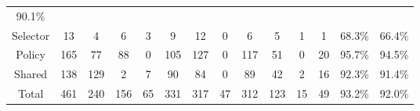 \begin{table*}[ht]
\begin{center}
\begin{tabular}{cccccccccccccc}
            90.1\% \\
          \multicolumn{1}{c|}{Selector} &
            \multicolumn{1}{c|}{13} &
            4 &
            6 &
            \multicolumn{1}{c|}{3} &
            9 &
            12 &
            \multicolumn{1}{c|}{0} &
            6 &
            5 &
            1 &
            \multicolumn{1}{c|}{1} &
            68.3\% &
            66.4\% \\
          \multicolumn{1}{c|}{Policy} &
            \multicolumn{1}{c|}{165} &
            77 &
            88 &
            \multicolumn{1}{c|}{0} &
            105 &
            127 &
            \multicolumn{1}{c|}{0} &
            117 &
            51 &
            0 &
            \multicolumn{1}{c|}{20} &
            95.7\% &
            94.5\% \\
          \multicolumn{1}{c|}{Shared} &
            \multicolumn{1}{c|}{138} &
            129 &
            2 &
            \multicolumn{1}{c|}{7} &
            90 &
            84 &
            \multicolumn{1}{c|}{0} &
            89 &
            42 &
            2 &
            \multicolumn{1}{c|}{16} &
            92.3\% &
            91.4\% \\
          \multicolumn{1}{c|}{Total} &
            \multicolumn{1}{c|}{461} &
            240 &
            156 &
            \multicolumn{1}{c|}{65} &
            331 &
            317 &
            \multicolumn{1}{c|}{47} &
            312 &
            123 &
            15 &
            \multicolumn{1}{c|}{49} &
            93.2\% &
            92.0\% \\ \hline
          \end{tabular}
        \label{test_case_statistics}
        \end{center}
        \end{table*}

